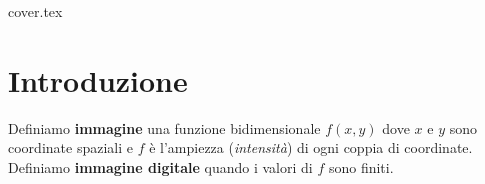 \documentclass[a4paper, 12pt]{book}
\begin{document}
    {cover.tex}
    \tableofcontents

    \chapter{Introduzione}

    Definiamo \textbf{immagine} una funzione bidimensionale \(f(x, y)\) dove \(x\) e \(y\) sono coordinate spaziali e \(f\) è l'ampiezza (\emph{intensità}) di ogni coppia di coordinate.\\
    Definiamo \textbf{immagine digitale} quando i valori di \(f\) sono finiti.\\
\end{document}
